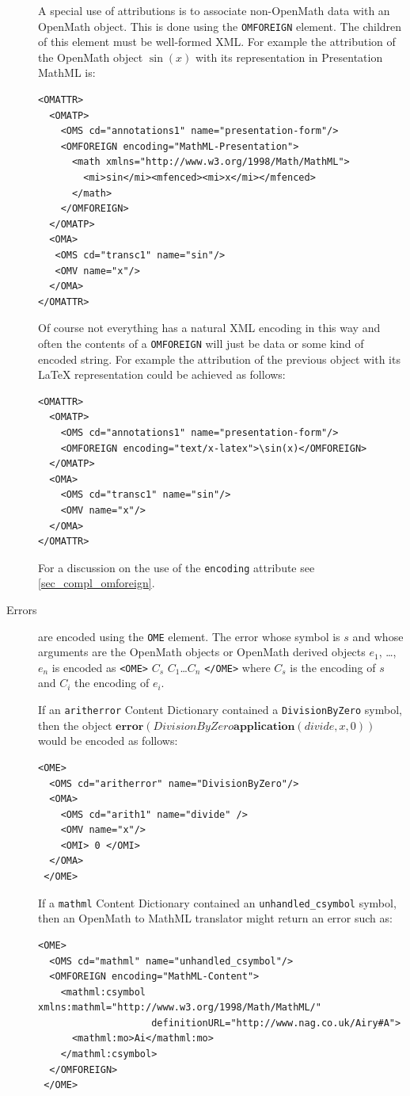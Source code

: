 \documentclass{report}
\def\OM{OpenMath\xspace}
\def\XML{XML\xspace}
\def\application#1{\mathbf{application}(#1)}
\def\error#1{\mathbf{error}(#1)}
\begin{document}
\begin{description}
A special use of attributions is to associate non-\OM data with an \OM object.  This is
done using the \lstinline|OMFOREIGN| element.  The children of this element must be
well-formed \XML.  For example the attribution of the \OM object $\sin(x)$ with its
representation in Presentation MathML is:
\begin{lstlisting}
<OMATTR>
  <OMATP>
    <OMS cd="annotations1" name="presentation-form"/>  
    <OMFOREIGN encoding="MathML-Presentation">
      <math xmlns="http://www.w3.org/1998/Math/MathML">
        <mi>sin</mi><mfenced><mi>x</mi></mfenced>
      </math>
    </OMFOREIGN>  
  </OMATP>
  <OMA>
   <OMS cd="transc1" name="sin"/> 
   <OMV name="x"/>  
  </OMA>
</OMATTR>
\end{lstlisting}
Of course not everything has a natural XML encoding in this way and
often the contents of a \lstinline|OMFOREIGN| will just
be data or some kind of encoded string.  For example the attribution
of the previous object with its LaTeX representation could be achieved
as follows:
\begin{lstlisting}
<OMATTR>
  <OMATP>
    <OMS cd="annotations1" name="presentation-form"/>  
    <OMFOREIGN encoding="text/x-latex">\sin(x)</OMFOREIGN>  
  </OMATP>
  <OMA>
    <OMS cd="transc1" name="sin"/> 
    <OMV name="x"/>  
  </OMA>
</OMATTR>
\end{lstlisting}
For a discussion on the use of the \lstinline|encoding|
attribute see \ref{sec_compl_omforeign}.
\item[Errors] are encoded using the \lstinline|OME| element. The error whose symbol is $s$
  and whose arguments are the \OM objects or \OM derived objects $e_1$, \ldots, $e_n$ is
  encoded as \lstinline|<OME>| $C_s$ $C_1$\ldots $C_n$ \lstinline|</OME>| where $C_s$ is
  the encoding of $s$ and $C_i$ the encoding of $e_i$.

  If an \lstinline|aritherror| Content Dictionary contained a \lstinline|DivisionByZero|
  symbol, then the object
  $\error{DivisionByZero{\application{divide,x,0}}}$ would be encoded as follows:

\begin{lstlisting}
<OME>
  <OMS cd="aritherror" name="DivisionByZero"/>  
  <OMA>
    <OMS cd="arith1" name="divide" />
    <OMV name="x"/>  
    <OMI> 0 </OMI>
  </OMA> 
 </OME>
\end{lstlisting}

  

If a \lstinline|mathml| Content Dictionary contained an
  \lstinline|unhandled_csymbol| symbol, then an \OM to
MathML translator might return an error such as:
\begin{lstlisting}
<OME>
  <OMS cd="mathml" name="unhandled_csymbol"/>  
  <OMFOREIGN encoding="MathML-Content">
    <mathml:csymbol xmlns:mathml="http://www.w3.org/1998/Math/MathML/"
                    definitionURL="http://www.nag.co.uk/Airy#A">
      <mathml:mo>Ai</mathml:mo>
    </mathml:csymbol>
  </OMFOREIGN> 
 </OME>
\end{lstlisting}



\end{description}
\end{document}
